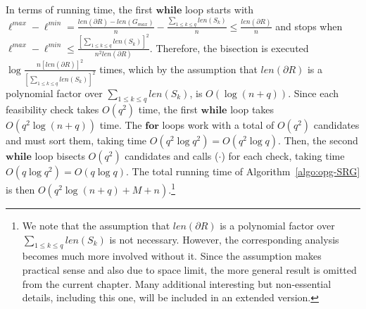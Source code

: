 \begin{algorithm}[H]
\begin{small}
		\vspace{0.025in}
		
		\caption{\algoSRG} \label{algo:opg-SRG}
	\end{small}
\end{algorithm}

In terms of running time, the first $\mathbf{while}$ loop starts with 
$\ell^{max} - \ell^{min} = \frac{len(\partial R) -  len(G_{max})}{n} -
\frac{\sum_{1\le k\le q}len(S_k)}{n} \le \frac{len(\partial R)}{n}$ and 
stops when $\ell^{max} - \ell^{min} \le 
\frac{[\sum_{1\le k\le q}len(S_k)]^2}{n^2len(\partial R)}$. Therefore, 
the bisection is executed 
$\log \frac{n[len(\partial R)]^2}{[\sum_{1\le k\le q}len(S_k)]^2}$ times, 
which by the assumption that $len(\partial R)$ is a polynomial factor over 
$\sum_{1\le k\le q}len(S_k)$, is $O(\log (n + q))$. Since each feasibility 
check takes $O(q^2)$ time, the first $\mathbf{while}$ loop takes 
$O(q^2\log(n + q))$ time. The $\mathbf{for}$ loops work with a total of 
$O(q^2)$ candidates and must sort them, taking time $O(q^2 \log q^2) = 
O(q^2 \log q)$. Then, the second $\mathbf{while}$ loop bisects $O(q^2)$ 
candidates and calls \isLFeasibleByTilingPartial($\cdot$) for each check, 
taking time $O(q\log q^2) = O(q\log q)$. The total running time of 
Algorithm~\ref{algo:opg-SRG} is then $O(q^2\log (n + q) + M + n)$.\footnote{We note that 
the assumption that $len(\partial R)$ is a polynomial factor over 
$\sum_{1\le k\le q}len(S_k)$ is not necessary. However, the corresponding 
analysis becomes much more involved without it. Since the assumption makes 
practical sense and also due to space limit, the more general result is 
omitted from the current chapter. Many additional interesting but 
non-essential details, including this one, will be included in an extended 
version.}
